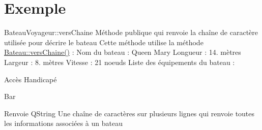 \hypertarget{_exemple-example}{}\section{Exemple}
Bateau\+Voyageur\+::vers\+Chaine Méthode publique qui renvoie la chaîne de caractère utilisée pour décrire le bateau Cette méthode utilise la méthode \hyperlink{class_bateau_a392f6a45649a2a35186dfcd1ca58eddc}{Bateau\+::vers\+Chaine()} \+: Nom du bateau \+: Queen Mary Longueur \+: 14. mètres Largeur \+: 8. mètres Vitesse \+: 21 noeuds Liste des équipements du bateau \+:
\begin{DoxyItemize}
\item Accès Handicapé
\item Bar \begin{DoxyReturn}{Renvoie}
Q\+String Une chaîne de caractères sur plusieurs lignes qui renvoie toutes les informations associées à un bateau
\end{DoxyReturn}

\begin{DoxyCodeInclude}
\end{DoxyCodeInclude}
 
\end{DoxyItemize}